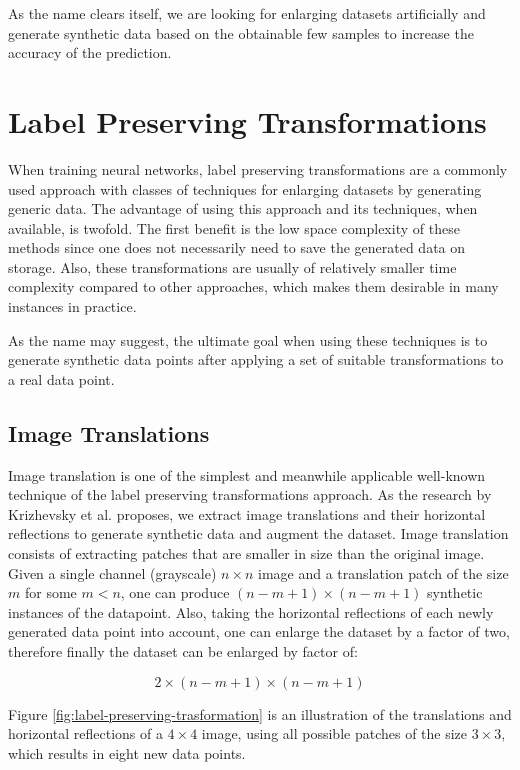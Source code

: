 As the name clears itself, we are looking for enlarging datasets artificially and generate synthetic
data based on the obtainable few samples to increase the accuracy of the prediction.

\section{Label Preserving Transformations}
When training neural networks, label preserving transformations are a commonly used approach with classes of
techniques for enlarging datasets by generating generic data. The advantage of using this approach
and its techniques, when available, is twofold. The first benefit is the low space complexity of these
methods since one does not necessarily need to save the generated data on storage. Also, these
transformations are usually of relatively smaller time complexity compared to other approaches,
which makes them desirable in many instances in practice.

As the name may suggest, the ultimate goal when using these techniques is to generate synthetic data points after applying a set of suitable transformations to a real data point.

\subsection{Image Translations}
\label{tit:image_translations}
Image translation is one of the simplest and meanwhile applicable well-known technique of the label
preserving transformations approach. As the research by Krizhevsky et al.
\cite{image_translation_paper} proposes, we extract
image translations and their horizontal reflections to generate synthetic data and augment the
dataset. Image translation consists of extracting patches that are smaller in size than the original
image. Given a single channel (grayscale) $n \times n$ image and a translation patch of the size
$m$ for some $m<n$, one can produce $(n-m+1) \times (n-m+1) $ synthetic instances of the datapoint. Also, taking
the horizontal reflections of each newly generated data point into account, one can enlarge the
dataset by a factor of two, therefore finally the dataset can be enlarged by factor of:

\begin{equation}
  \label{eq:image_translate}
  2\times(n-m+1)\times(n-m+1)
\end{equation}

Figure \ref{fig:label-preserving-trasformation} is an illustration of the translations and horizontal
reflections of a $4 \times 4$ image, using all
possible patches of the size $3 \times 3$, which results in eight new data points.


